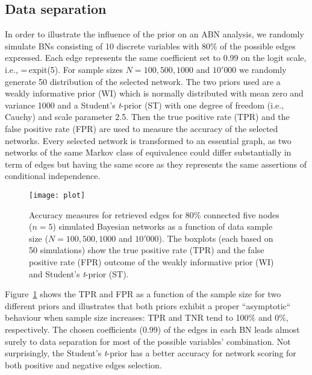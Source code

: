 \documentclass{svproc}
\newcommand{\MP}[1]{\textcolor{red}{#1}}
\begin{document}
\subsection{Data separation}
In order to illustrate the influence of the prior on an ABN analysis, we randomly simulate BNs consisting of 10 discrete variables with 80$\%$ of the possible edges expressed. Each edge represents the same coefficient set to 0.99 on the logit scale, i.e., =\,expit(5). 
For sample sizes $N=100, 500, 1000$ and $10'000$ we randomly generate 50 distribution of the selected network. 
The two priors used are a weakly informative prior (WI) which is normally distributed with mean zero and variance 1000 and a Student's \emph{t}-prior (ST) with one degree of freedom (i.e., Cauchy) and scale parameter 2.5. Then the true positive rate (TPR) and the false positive rate (FPR) are used to measure the accuracy of the selected networks. Every selected network is transformed to an essential graph, as two networks of the same Markov class of equivalence could differ substantially in term of edges but having the same score as they represents the same assertions of conditional independence.

\begin{figure}
\centering
\texttt{[image: plot]}
\caption{Accuracy measures for retrieved edges for 80\% connected five nodes ($n=5$) simulated Bayesian networks as a function of data sample size ($N=100, 500, 1000$ and $10'000$).
The boxplots (each based on 50 simulations) show the true positive rate (TPR) and the false positive rate (FPR) outcome of the weakly informative prior (WI) and Student's \emph{t}-prior (ST). 
}
\label{plot} 
\end{figure}


Figure~\ref{plot} shows the TPR and FPR as a function of the sample size for two different priors and  illustrates that both priors exhibit a proper ``asymptotic`` behaviour when sample size increases:  TPR and TNR tend to 100$\%$ and 0$\%$, respectively. The chosen coefficients (0.99) of the edges in each BN leads almost surely to data separation for most of the possible variables' combination. Not surprisingly,  the Student's \emph{t}-prior has a better accuracy for network scoring for both positive and negative edges selection.
\end{document}
